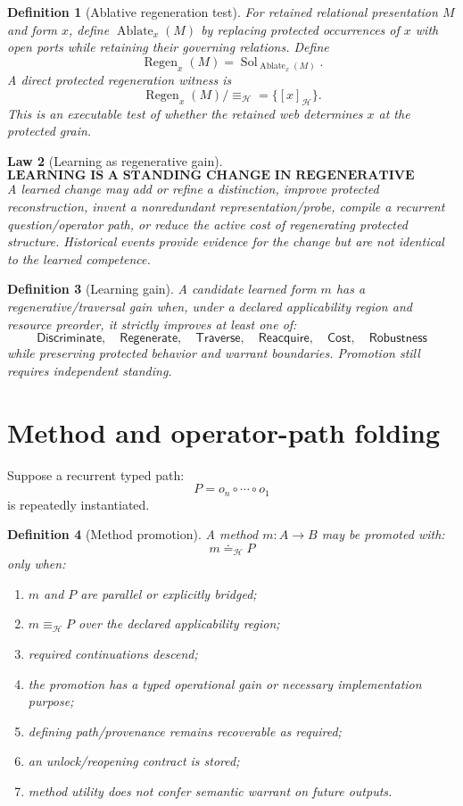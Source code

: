 \documentclass[11pt,oneside]{article}
\newtheorem{definition}{Definition}[section]
\newtheorem{law}[definition]{Law}
\begin{document}
\begin{definition}[Ablative regeneration test]
For retained relational presentation \(M\) and form \(x\), define \(\operatorname{Ablate}_x(M)\) by replacing protected occurrences of \(x\) with open ports while retaining their governing relations.  Define
\[
\boxed{
\operatorname{Regen}_x(M)
=
\operatorname{Sol}_{\operatorname{Ablate}_x(M)}.
}
\]
A direct protected regeneration witness is
\[
\operatorname{Regen}_x(M)/{\equiv_{\mathcal H}}
=
\{[x]_{\mathcal H}\}.
\]
This is an executable test of whether the retained web determines \(x\) at the protected grain.
\end{definition}

\begin{law}[Learning as regenerative gain]
\[
\boxed{\textbf{LEARNING IS A STANDING CHANGE IN REGENERATIVE CAPACITY.}}
\]
A learned change may add or refine a distinction, improve protected reconstruction, invent a nonredundant representation/probe, compile a recurrent question/operator path, or reduce the active cost of regenerating protected structure.  Historical events provide evidence for the change but are not identical to the learned competence.
\end{law}

\begin{definition}[Learning gain]
A candidate learned form \(m\) has a regenerative/traversal gain when, under a declared applicability region and resource preorder, it strictly improves at least one of:
\[
\mathsf{Discriminate},\quad
\mathsf{Regenerate},\quad
\mathsf{Traverse},\quad
\mathsf{Reacquire},\quad
\mathsf{Cost},\quad
\mathsf{Robustness}
\]
while preserving protected behavior and warrant boundaries.  Promotion still requires independent standing.
\end{definition}

\section{Method and operator-path folding}

Suppose a recurrent typed path:
\[
P=o_n\circ\cdots\circ o_1
\]
is repeatedly instantiated.

\begin{definition}[Method promotion]
A method \(m:A\to B\) may be promoted with:
\[
m\doteq_{\mathcal H}P
\]
only when:
\begin{enumerate}
\item \(m\) and \(P\) are parallel or explicitly bridged;
\item \(m\equiv_{\mathcal H}P\) over the declared applicability region;
\item required continuations descend;
\item the promotion has a typed operational gain or necessary implementation purpose;
\item defining path/provenance remains recoverable as required;
\item an unlock/reopening contract is stored;
\item method utility does not confer semantic warrant on future outputs.
\end{enumerate}
\end{definition}
\end{document}
